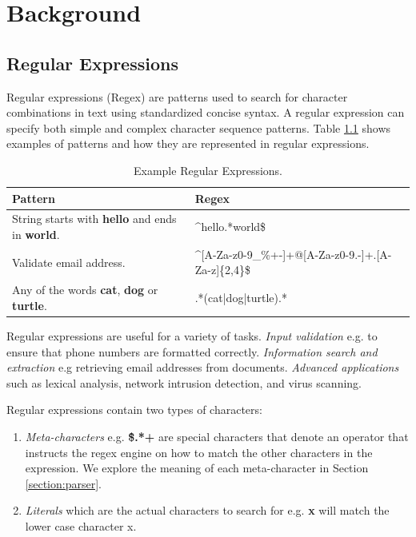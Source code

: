 \chapter{Background}\label{chapter:background}

\section{Regular Expressions}
Regular expressions (Regex) are patterns used to search for character combinations in text using standardized concise syntax. A regular expression can specify both simple and complex character sequence patterns. Table \ref{tab:regexsamp} shows examples of patterns and how they are represented in regular expressions.

{\renewcommand{\arraystretch}{1.5}%
\begin{table}[ht]
\centering
\begin{adjustbox}{width=1.1\textwidth,center=\textwidth}
\small
\begin{tabular}{|l|l|}
\hline
Pattern        & Regex  \\
\hline
String starts with \textbf{hello} and ends in \textbf{world}. & \^{}hello.*world\$ \\
\hline
Validate email address. & \^{}[A-Za-z0-9\_\%+-]+@[A-Za-z0-9.-]+.[A-Za-z]\{2,4\}\$ \\
\hline
Any of the words \textbf{cat}, \textbf{dog} or \textbf{turtle}. & .*(cat|dog|turtle).*\\
\hline
\end{tabular}
\end{adjustbox}
\caption[Example Regular Expressions]{Example Regular Expressions.}\label{tab:regexsamp}
\end{table}}

 Regular expressions are useful for a variety of tasks. \textit{Input validation} e.g. to ensure that phone numbers are formatted correctly. \textit{Information search and extraction} e.g retrieving email addresses from documents. \textit{Advanced applications} such as lexical analysis, network intrusion detection, and virus scanning.

Regular expressions contain two types of characters:
\begin{enumerate}
    \item \textit{Meta-characters} e.g. \textbf{\^\$.*+} are special characters that denote an operator that instructs the regex engine on how to match the other characters in the expression. We explore the meaning of each meta-character in Section \ref{section:parser}. 
    \item \textit{Literals} which are the actual characters to search for e.g. \textbf{x} will match the lower case character x.
\end{enumerate}

